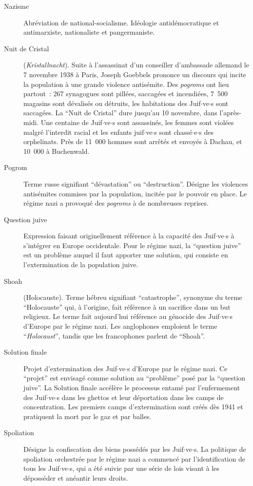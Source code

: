 \begin{description}
    \item[Nazisme] Abréviation de national-socialisme. Idéologie antidémocratique et antimarxiste, nationaliste et pangermaniste.
    
    \item[Nuit de Cristal] (\textit{Kristallnacht}). Suite à l'assassinat d'un conseiller d'ambassade allemand le 7 novembre 1938 à Paris, Joseph Goebbels prononce un discours qui incite la population à une grande violence antisémite. Des \textit{pogroms} ont lieu partout~: 267 synagogues sont pillées, saccagées et incendiées, 7~500 magasins sont dévalisés ou détruits, les habitations des Juif$\cdot$ve$\cdot$s sont saccagées. La \enquote{Nuit de Cristal} dure jusqu'au 10 novembre, dans l'après-midi. Une centaine de Juif$\cdot$ve$\cdot$s sont assassinés, les femmes sont violées malgré l'interdit racial et les enfants juif$\cdot$ve$\cdot$s sont chassé$\cdot$e$\cdot$s des orphelinats. Près de 11~000 hommes sont arrêtés et envoyés à Dachau, et 10~000 à Buchenwald.
    
    \item[Pogrom] Terme russe signifiant 
    \enquote{dévastation} ou \enquote{destruction}. Désigne les violences antisémites commises par la population, incitée par le pouvoir en place. Le régime nazi a provoqué des \textit{pogroms} à de nombreuses reprises.
    
    \item[Question juive] Expression faisant originellement référence à la capacité des Juif$\cdot$ve$\cdot$s à s'intégrer en Europe occidentale. Pour le régime nazi, la \enquote{question juive} est un problème auquel il faut apporter une solution, qui consiste en l'extermination de la population juive.
    
    \item[Shoah] (Holocauste). Terme hébreu signifiant \enquote{catastrophe}, synonyme du terme \enquote{Holocauste} qui, à l'origine, fait référence à un sacrifice dans un but religieux. Le terme fait aujourd'hui référence au génocide des Juif$\cdot$ve$\cdot$s d'Europe par le régime nazi. Les anglophones emploient le terme \enquote{\textit{Holocaust}}, tandis que les francophones parlent de \enquote{Shoah}.
    
    \item[Solution finale] Projet d'extermination des Juif$\cdot$ve$\cdot$s d'Europe par le régime nazi. Ce \enquote{projet} est envisagé comme solution au \enquote{problème} posé par la \enquote{question juive}. La Solution finale accélère le processus entamé par l'enfermement des Juif$\cdot$ve$\cdot$s dans les ghettos et leur déportation dans les camps de concentration. Les premiers camps d'extermination sont créés dès 1941 et pratiquent la mort par le gaz et par balles.
    
    \item[Spoliation] Désigne la confiscation des biens possédés par les Juif$\cdot$ve$\cdot$s. La politique de spoliation orchestrée par le régime nazi a commencé par l'identification de tous les Juif$\cdot$ve$\cdot$s, qui a été suivie par une série de lois visant à les déposséder et anéantir leurs droits.
    
\end{description}